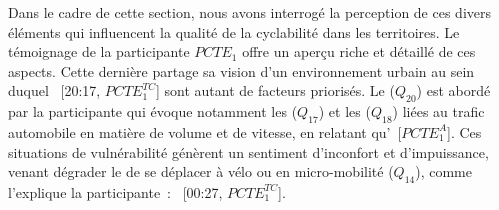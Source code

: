 \begin{refsegment}
Dans le cadre de cette section, nous avons interrogé la perception de ces divers éléments qui influencent la qualité de la cyclabilité dans les territoires. Le témoignage de la participante \(PCTE_{1}\) offre un aperçu riche et détaillé de ces aspects. Cette dernière partage sa vision d'un environnement urbain au sein duquel ~[20:17, \(PCTE^{TC}_{1}\)] sont autant de facteurs priorisés. Le  (\(Q_{20}\)) est abordé par la participante qui évoque notamment les  (\(Q_{17}\)) et les  (\(Q_{18}\)) liées au trafic automobile en matière de volume et de vitesse, en relatant qu'~[\(PCTE^{A}_{1}\)]. Ces situations de vulnérabilité génèrent un sentiment d'inconfort et d'impuissance, venant dégrader le  de se déplacer à vélo ou en micro-mobilité (\(Q_{14}\)), comme l'explique la participante~: ~[00:27, \(PCTE^{TC}_{1}\)].%


\end{refsegment}
